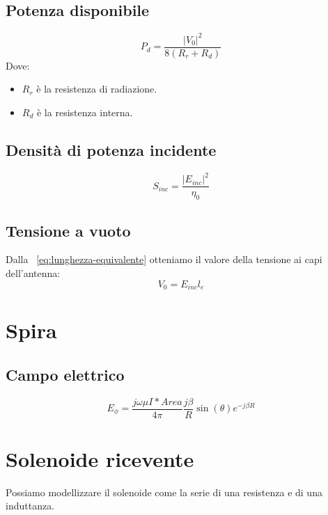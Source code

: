 \documentclass[10pt,a4paper]{report}
\begin{document}
			\subsection{Potenza disponibile}			
				\begin{equation}
			P_d=\frac{|V_0|^2}{8(R_r+R_d)}
				\end{equation}
			Dove:

			\begin{itemize}
			\item $R_r$ è la resistenza di radiazione.
			\item $R_d$ è la resistenza interna.
			\end{itemize}
			
			\subsection{Densità di potenza incidente}

			\[
			S_{inc}=\frac{|E_{inc}|^2}{\eta_0}	
			\]

			\subsection{Tensione a vuoto}			
				Dalla ~\ref{eq:lunghezza-equivalente} otteniamo il valore della tensione ai capi dell'antenna:
				\begin{equation}
				V_0=E_{inc}l_e
				\end{equation}

		\section{Spira}

			\subsection{Campo elettrico}

				\begin{equation}
				E_\phi=\frac{j\omega\mu I*Area}{4\pi}\frac{j\beta}{R}\sin(\theta)e^{-j\beta R}
				\end{equation}

		\section{Solenoide ricevente}
			
			Possiamo modellizzare il solenoide come la serie di una resistenza e di una induttanza.
\end{document}
